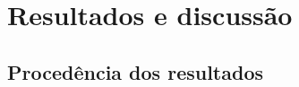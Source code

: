 
\makeatletter
{}
\makeatother

\providecommand{\kxfig}[1]{../../experiments/figures/output/#1}
\providecommand{\kxhw}[1]{../../#1}

\chapter{Resultados e discussão}
\label{cap:resultados}

\section{Procedência dos resultados}
\label{sec:proc}

